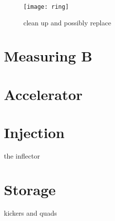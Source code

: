 \begin{figure}[]
    \centering
    \texttt{[image: ring]}
    \caption[ring]{clean up and possibly replace}   
    \label{fig:ring}
\end{figure}





\section{Measuring B}
\label{sec:BIntro}






\section{Accelerator}
\label{sec:Accelerator}




\cite{Stratakis:2017uci}


\section{Injection}
\label{sec:Injection}

the inflector



\section{Storage}
\label{sec:Storage}

kickers and quads





